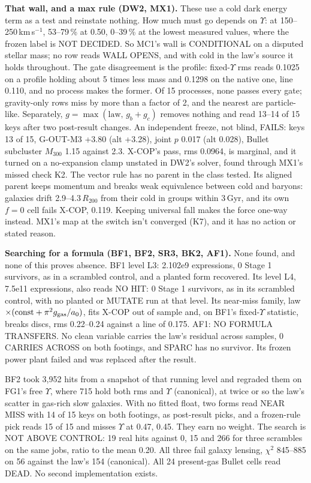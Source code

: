 \documentclass[10pt]{article}
\begin{document}
\textbf{That wall, and a max rule (DW2, MX1).} These use a cold dark energy term as a test and reinstate nothing. How much must go depends on $\Upsilon$: at 150--250\,km\,s$^{-1}$, 53--79\,\% at 0.50, 0--39\,\% at the lowest measured values, where the frozen label is NOT DECIDED. So MC1's wall is CONDITIONAL on a disputed stellar mass; no row reads WALL OPENS, and with cold in the law's source it holds throughout. The gate disagreement is the profile: fixed-$\Upsilon$ rms reads 0.1025 on a profile holding about 5 times less mass and 0.1298 on the native one, line 0.110, and no process makes the former. Of 15 processes, none passes every gate; gravity-only rows miss by more than a factor of 2, and the nearest are particle-like. Separately, $g=\max(\text{law},\,g_b+g_c)$ removes nothing and read 13--14 of 15 keys after two post-result changes. An independent freeze, not blind, FAILS: keys 13 of 15, G-OUT-M3 +3.80 (alt +3.28), joint $p$ 0.017 (alt 0.028), Bullet subcluster $M_{300}$ 1.15 against 2.3. X-COP's pass, rms 0.0964, is marginal, and it turned on a no-expansion clamp unstated in DW2's solver, found through MX1's missed check K2. The vector rule has no parent in the class tested. Its aligned parent keeps momentum and breaks weak equivalence between cold and baryons: galaxies drift 2.9--4.3\,$R_{200}$ from their cold in groups within 3\,Gyr, and its own $f=0$ cell fails X-COP, 0.119. Keeping universal fall makes the force one-way instead. MX1's map at the switch isn't converged (K7), and it has no action or stated reason.

\textbf{Searching for a formula (BF1, BF2, SR3, BK2, AF1).} None found, and none of this proves absence. BF1 level L3: 2.102e9 expressions, 0 Stage 1 survivors, as in a scrambled control, and a planted form recovered. Its level L4, 7.5e11 expressions, also reads NO HIT: 0 Stage 1 survivors, as in its scrambled control, with no planted or MUTATE run at that level. Its near-miss family, law $\times(\text{const}+\pi^2 g_{\rm gas}/a_0)$, fits X-COP out of sample and, on BF1's fixed-$\Upsilon$ statistic, breaks discs, rms 0.22--0.24 against a line of 0.175. AF1: NO FORMULA TRANSFERS. No clean variable carries the law's residual across samples, 0 CARRIES ACROSS on both footings, and SPARC has no survivor. Its frozen power plant failed and was replaced after the result.

BF2 took 3,952 hits from a snapshot of that running level and regraded them on FG1's free $\Upsilon$, where 715 hold both rms and $\Upsilon$ (canonical), at twice or so the law's scatter in gas-rich slow galaxies. With no fitted float, two forms read NEAR MISS with 14 of 15 keys on both footings, as post-result picks, and a frozen-rule pick reads 15 of 15 and misses $\Upsilon$ at 0.47, 0.45. They earn no weight. The search is NOT ABOVE CONTROL: 19 real hits against 0, 15 and 266 for three scrambles on the same jobs, ratio to the mean 0.20. All three fail galaxy lensing, $\chi^2$ 845--885 on 56 against the law's 154 (canonical). All 24 present-gas Bullet cells read DEAD. No second implementation exists.
\end{document}

